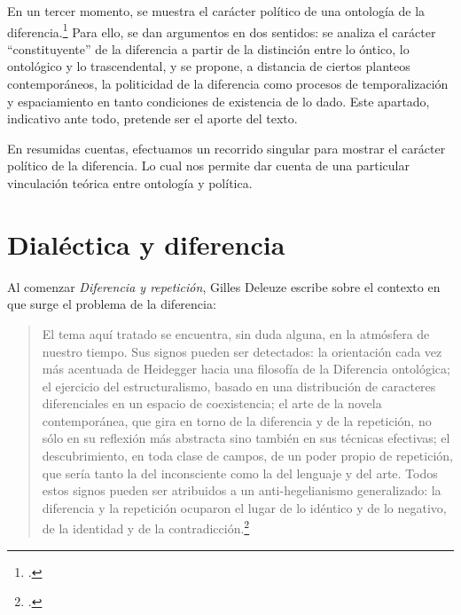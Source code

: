 En un tercer momento, se muestra el carácter político de una ontología de la diferencia.\footcite[\emph{Ontología diferencial} es el título de una propuesta reciente de Miguel de Beistegui que cruza los planteos de Heidegger y Deleuze para elaborar una filosofía que escape a su fragmentación. Aquí, a diferencia de Beistegui, se trata de pensar desde una perspectiva política esta ontología diferencial. Véase][]{@6960-BEISTEGUI2004} Para ello, se dan argumentos en dos sentidos: se analiza el carácter \enquote{constituyente} de la diferencia a partir de la distinción entre lo óntico, lo ontológico y lo trascendental, y se propone, a distancia de ciertos planteos contemporáneos, la politicidad de la diferencia como procesos de temporalización y espaciamiento en tanto condiciones de existencia de lo dado. Este apartado, indicativo ante todo, pretende ser el aporte del texto.

En resumidas cuentas, efectuamos un recorrido singular para mostrar el carácter político de la diferencia. Lo cual nos permite dar cuenta de una particular vinculación teórica entre ontología y política.

\section{Dialéctica y diferencia}

Al comenzar \emph{Diferencia y repetición}, Gilles Deleuze escribe sobre el contexto en que surge el problema de la diferencia:

\begin{quote}
El tema aquí tratado se encuentra, sin duda alguna, en la atmósfera de nuestro tiempo. Sus signos pueden ser detectados: la orientación cada vez más acentuada de Heidegger hacia una filosofía de la Diferencia ontológica; el ejercicio del estructuralismo, basado en una distribución de caracteres diferenciales en un espacio de coexistencia; el arte de la novela contemporánea, que gira en torno de la diferencia y de la repetición, no sólo en su reflexión más abstracta sino también en sus técnicas efectivas; el descubrimiento, en toda clase de campos, de un poder propio de repetición, que sería tanto la del inconsciente como la del lenguaje y del arte. Todos estos signos pueden ser atribuidos a un anti-hegelianismo generalizado: la diferencia y la repetición ocuparon el lugar de lo idéntico y de lo negativo, de la identidad y de la contradicción.\footcite[15]{@6961-DELEUZE2002}
\end{quote}


